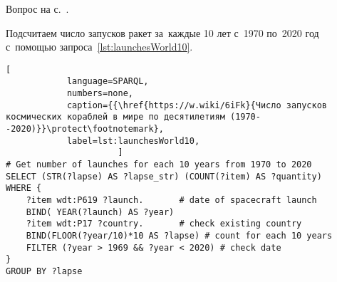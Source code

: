 \newpage
\begin{task}
    \label{answer:max-min-space-launches}
    \AnswerBackref Вопрос на с.~\pageref{question:spacecraft_2}.

    Подсчитаем число запусков ракет за~каждые 10 лет с~1970 по~2020 год с~помощью запроса~\ref{lst:launchesWorld10}.
    \begin{lstlisting}[ 
            language=SPARQL, 
            numbers=none, 
            caption={{\href{https://w.wiki/6iFk}{Число запусков космических кораблей в мире по десятилетиям (1970--2020)}}\protect\footnotemark}, 
            label=lst:launchesWorld10, 
                      ]
# Get number of launches for each 10 years from 1970 to 2020
SELECT (STR(?lapse) AS ?lapse_str) (COUNT(?item) AS ?quantity) 
WHERE {                  
    ?item wdt:P619 ?launch.       # date of spacecraft launch
    BIND( YEAR(?launch) AS ?year) 
    ?item wdt:P17 ?country.       # check existing country
    BIND(FLOOR(?year/10)*10 AS ?lapse) # count for each 10 years
    FILTER (?year > 1969 && ?year < 2020) # check date
} 
GROUP BY ?lapse
\end{lstlisting}
\end{task}


